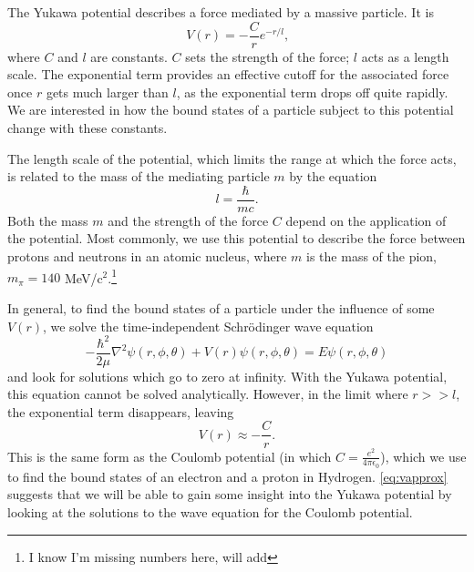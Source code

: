 \documentclass[12pt,twoside]{reedthesis}
\newcommand{\eqn}[1]{\begin{equation}#1\end{equation}}
\begin{document}
The Yukawa potential describes a force mediated by a massive particle. It is %
\eqn{
V(r) = -\frac{C}{r}e^{-r/l}\mbox{,}
}
where $C$ and $l$ are constants. $C$ sets the strength of the force; $l$ acts as a length scale. The exponential term provides an effective cutoff for the associated force once $r$ gets much larger than $l$, as the exponential term drops off quite rapidly. We are interested in how the bound states of a particle subject to this potential change with these constants. 

The length scale of the potential, which limits the range at which the force acts, is related to the mass of the mediating particle $m$ by the equation\eqn{
l = \frac{\hbar}{m c}\mbox{.}
}
Both the mass $m$ and the strength of the force $C$ depend on the application of the potential. Most commonly, we use this potential to describe the force between protons and neutrons in an atomic nucleus, where $m$ is the mass of the pion, $m_{\pi} = 140$ MeV/c$^2$.\footnote{I know I'm missing numbers here, will add}

In general, to find the bound states of a particle under the influence of some $V(r)$, we solve the time-independent Schr\"odinger wave equation
\eqn{
-\frac{\hbar^2}{2\mu}\nabla^2\psi(r,\phi,\theta) + V(r)\psi (r,\phi,\theta) = E \psi(r,\phi,\theta)
\label{eq:TIDSWE-general}
} and look for solutions which go to zero at infinity.
With the Yukawa potential, this equation cannot be solved analytically. However, in the limit where $r >> l$, the exponential term disappears, leaving
\eqn{
V(r) \approx -\frac{C}{r}\mbox{.}
\label{eq:vapprox}
}
This is the same form as the Coulomb potential (in which $C = \frac{e^2}{4\pi\epsilon_0}$), which we use to find the bound states of an electron and a proton in Hydrogen. \eqref{eq:vapprox} suggests that we will be able to gain some insight into the Yukawa potential by looking at the solutions to the wave equation for the Coulomb potential. 
\end{document}
